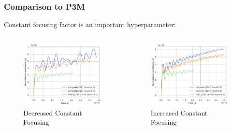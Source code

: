 \documentclass[.08pt,aspectratio=169,t]{beamer}
\begin{document}
\begin{frame}
    \frametitle{Comparison to P3M}

     \item Constant focusing factor is an important hyperparameter:
     \begin{columns}

\begin{figure}[!htb]
  \includegraphics[width=0.9\linewidth]{figures/comparison_low_focus.pdf}
    \caption{Decreased Constant Focusing} 
  \label{fig:awesome_image3}
\end{figure}

\begin{figure}[!htb]
  \includegraphics[width=0.9\linewidth]{figures/comparison_high_focus.pdf}
    \caption{Increased Constant Focusing} 
  \label{fig:awesome_image3}
\end{figure}

     \end{columns}

\end{frame}
\end{document}
